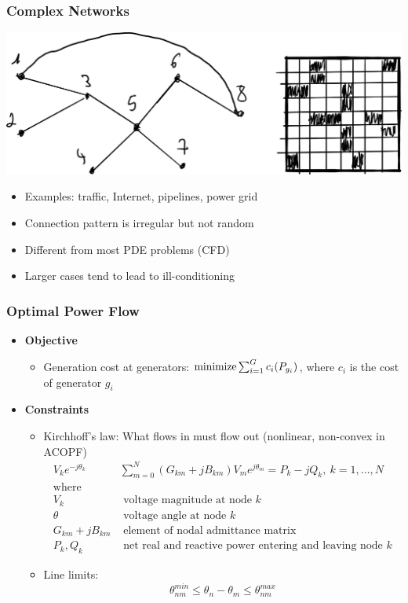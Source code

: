 \begin{frame}
  \frametitle{Complex Networks}
  \includegraphics[width=\textwidth]{figures/complexn}
  \begin{itemize}
    \item Examples: traffic, Internet, pipelines, power grid
    \item Connection pattern is irregular but not random
    \item Different from most PDE problems (CFD)
    \item Larger cases tend to lead to ill-conditioning
  \end{itemize}
\end{frame}

\begin{frame}[fragile]
  \frametitle{Optimal Power Flow}
  \begin{itemize}
    \item {\bf Objective}
    \begin{itemize}
      \item Generation cost at generators:
      $ \minimize \sum^G_{i=1} c_i(P_{g_i})$, where $c_i$ is the cost of generator $g_i$
    \end{itemize}
    \item {\bf Constraints}
    \begin{itemize}
      \item Kirchhoff's law: What flows in must flow out (nonlinear, non-convex in ACOPF)
      \begin{align*}
        V_k e^{-j\theta_k} & \sum^{N}_{m=0} (G_{km} + jB_{km})V_m e^{j\theta_m} = P_k - j Q_k,\ k = 1, \dots, N \\
        \text{where}\\
        V_k &\text{ voltage magnitude at node } k\\
        \theta &\text{ voltage angle at node } k\\
        G_{km} + jB_{km}& \text{ element of nodal admittance matrix}\\
        P_k , Q_k &\text{ net real and reactive power entering and leaving node } k
      \end{align*}
      \item Line limits:
      $$ \theta^{min}_{nm} \leq \theta_n - \theta_m \leq \theta^{max}_{nm}$$
    \end{itemize}
  \end{itemize}
\end{frame}

